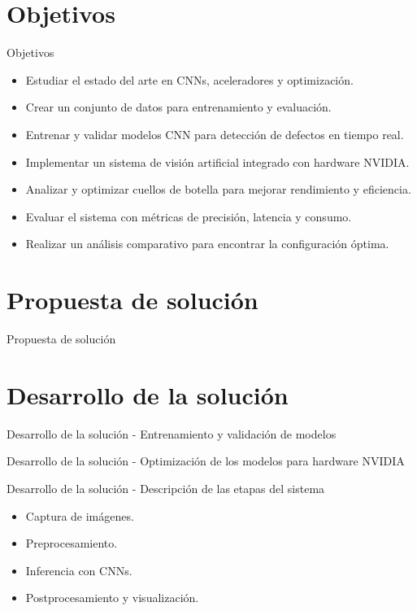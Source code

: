 \documentclass[spanish]{beamer}
\begin{document}
\section{Objetivos}
\begin{frame}{Objetivos}
    \begin{itemize}
        \item Estudiar el estado del arte en CNNs, aceleradores y optimización.
        \item Crear un conjunto de datos para entrenamiento y evaluación.
        \item Entrenar y validar modelos CNN para detección de defectos en tiempo real.
        \item Implementar un sistema de visión artificial integrado con hardware NVIDIA.
        \item Analizar y optimizar cuellos de botella para mejorar rendimiento y eficiencia.
        \item Evaluar el sistema con métricas de precisión, latencia y consumo.
        \item Realizar un análisis comparativo para encontrar la configuración óptima.
    \end{itemize}
\end{frame}

\section{Propuesta de solución}
\begin{frame}{Propuesta de solución}
\end{frame}

\section{Desarrollo de la solución}

\begin{frame}{Desarrollo de la solución - Entrenamiento y validación de modelos}
\end{frame}

\begin{frame}{Desarrollo de la solución - Optimización de los modelos para hardware NVIDIA}
\end{frame}

\begin{frame}{Desarrollo de la solución - Descripción de las etapas del sistema}
    \begin{itemize}
        \item Captura de imágenes.
        \item Preprocesamiento.
        \item Inferencia con CNNs.
        \item Postprocesamiento y visualización.
    \end{itemize}
\end{frame}
\end{document}
